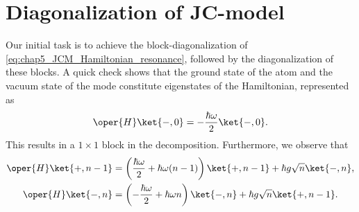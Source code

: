 \chapter{Diagonalization of JC-model\label{appen:chap5_JC_calculations}}

Our initial task is to achieve the block-diagonalization of
\ref{eq:chap5_JCM_Hamiltonian_resonance}, followed by the diagonalization 
of these blocks. A quick check shows that the ground state of 
the atom and the vacuum state of the mode constitute eigenstates of 
the Hamiltonian, represented as
\begin{equation}
    \label{eq:appen_JCM_ground_state}
    \oper{H}\ket{-, 0} = -\frac{\hbar \omega}{2} \ket{-, 0}.
\end{equation}
This results in a $1 \times 1$ block in the decomposition. 
Furthermore, we observe that
\begin{equation}
    \label{eq:appen_JCM_excited_state}
    \begin{gathered}
        \oper{H}\ket{+, n-1} = \left( \frac{\hbar \omega}{2} + \hbar \omega (n-1) \right) 
        \ket{+, n-1} + \hbar g \sqrt{n} \ket{-, n},\\
    \oper{H}\ket{-, n} = \left( -\frac{\hbar \omega}{2} + \hbar \omega n \right) \ket{-, n} + \hbar g \sqrt{n} \ket{+, n-1}.
    \end{gathered}
\end{equation}

